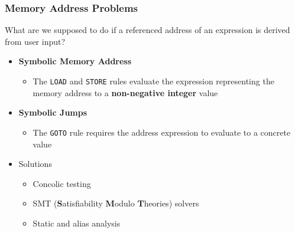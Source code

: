 \begin{frame}
	\frametitle{Memory Address Problems}
	What are we supposed to do if a referenced address of an expression is derived from user input?
	\begin{itemize}
		\item \textbf{Symbolic Memory Address}
		\begin{itemize}
			\item The \texttt{LOAD} and \texttt{STORE} rules evaluate the expression representing the memory address to a \textbf{non-negative integer} value
		\end{itemize}
		\item \textbf{Symbolic Jumps}
		\begin{itemize}
			\item The \texttt{GOTO} rule requires the address expression to evaluate to a concrete value
		\end{itemize}
		\item<2-> Solutions
		\begin{itemize}
			\item Concolic testing
			\item SMT (\textbf{S}atisfiability \textbf{M}odulo \textbf{T}heories) solvers
			\item Static and alias analysis
		\end{itemize}
	\end{itemize}
\end{frame}